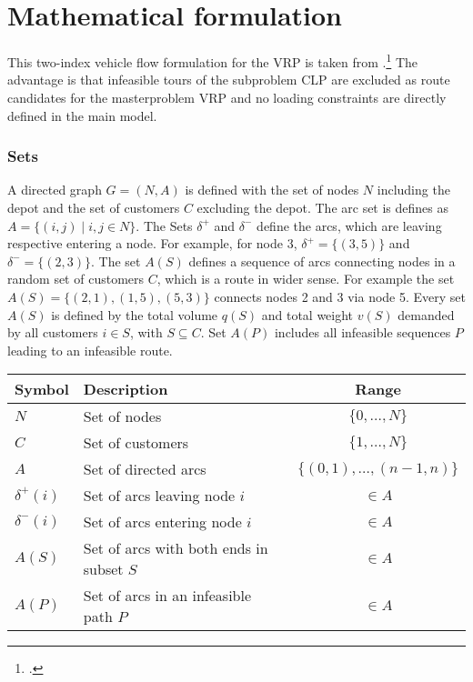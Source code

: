 \chapter{Mathematical formulation}
\label{chap:mathematical_formulation}

This two-index vehicle flow formulation for the \gls{VRP} is taken from \cite{tamke_branch-and-cut_2024}.\footcite[cf.][pp. 6-7]{tamke_branch-and-cut_2024}
The advantage is that infeasible tours of the subproblem \gls{CLP} are excluded
as route candidates for the masterproblem \gls{VRP} and no loading constraints are directly defined in the main model.

\subsection*{Sets}
A directed graph $G=(N,A)$ is defined with the set of nodes $N$ including
the depot and the set of customers $C$ excluding the depot. The arc set is
defines as $A = \{ (i, j) \mid i, j \in N \}$. The Sets $\delta^+$ and $\delta^-$ define
the arcs, which are leaving respective entering a node. For example, for node 3, $\delta^+ = \{(3,5)\}$ and $\delta^-= \{(2,3)\}$.
The set $A(S)$ defines a sequence of arcs connecting nodes in a random set of customers $C$,
which is a route in wider sense. For example the set $A(S)=\{(2,1),(1,5),(5,3)\}$ connects nodes
2 and 3 via node 5. Every set $A(S)$ is defined by the total volume $q(S)$ and total weight $v(S)$
demanded by all customers $i \in S$, with $S \subseteq C$. Set $A(P)$ includes all infeasible sequences $P$ leading
to an infeasible route.

\begin{table}[ht]
    \centering
    \begin{tabular}{llc}
        \toprule
        Symbol        & Description                              & Range                         \\
        \midrule
        $N$           & Set of nodes                             & $\{ 0, \dots, N \}$           \\
        $C$           & Set of customers                         & $\{ 1, \dots, N \} $          \\
        $A$           & Set of directed arcs                     & $\{(0,1), \dots, (n-1, n) \}$ \\
        $\delta^+(i)$ & Set of arcs leaving node $i$             & $\in A$                       \\
        $\delta^-(i)$ & Set of arcs entering node $i$            & $\in A$                       \\
        $A(S)$        & Set of arcs with both ends in subset $S$ & $\in A$                       \\
        $A(P)$        & Set of arcs in an infeasible path $P$    & $\in A$                       \\
        \bottomrule
    \end{tabular}
\end{table}
\vspace{0.2em}


